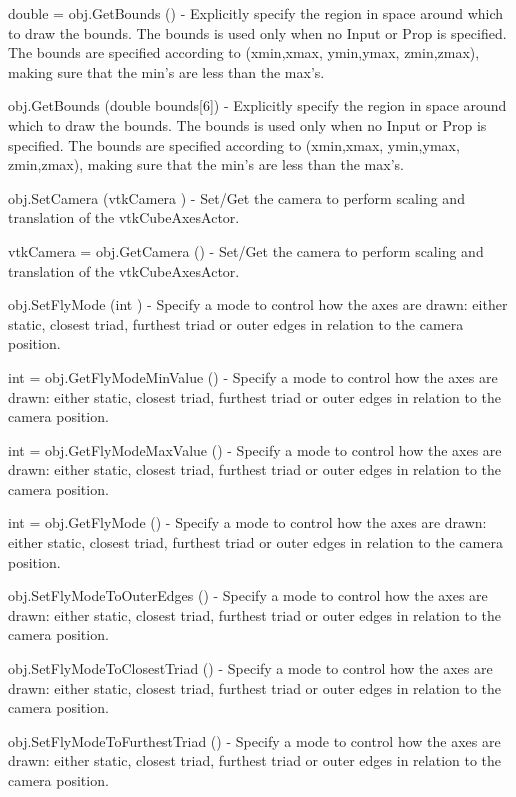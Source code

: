 \begin{DoxyItemize}
\item {\ttfamily double = obj.\-Get\-Bounds ()} -\/ Explicitly specify the region in space around which to draw the bounds. The bounds is used only when no Input or Prop is specified. The bounds are specified according to (xmin,xmax, ymin,ymax, zmin,zmax), making sure that the min's are less than the max's.  
\item {\ttfamily obj.\-Get\-Bounds (double bounds\mbox{[}6\mbox{]})} -\/ Explicitly specify the region in space around which to draw the bounds. The bounds is used only when no Input or Prop is specified. The bounds are specified according to (xmin,xmax, ymin,ymax, zmin,zmax), making sure that the min's are less than the max's.  
\item {\ttfamily obj.\-Set\-Camera (vtk\-Camera )} -\/ Set/\-Get the camera to perform scaling and translation of the vtk\-Cube\-Axes\-Actor.  
\item {\ttfamily vtk\-Camera = obj.\-Get\-Camera ()} -\/ Set/\-Get the camera to perform scaling and translation of the vtk\-Cube\-Axes\-Actor.  
\item {\ttfamily obj.\-Set\-Fly\-Mode (int )} -\/ Specify a mode to control how the axes are drawn\-: either static, closest triad, furthest triad or outer edges in relation to the camera position.  
\item {\ttfamily int = obj.\-Get\-Fly\-Mode\-Min\-Value ()} -\/ Specify a mode to control how the axes are drawn\-: either static, closest triad, furthest triad or outer edges in relation to the camera position.  
\item {\ttfamily int = obj.\-Get\-Fly\-Mode\-Max\-Value ()} -\/ Specify a mode to control how the axes are drawn\-: either static, closest triad, furthest triad or outer edges in relation to the camera position.  
\item {\ttfamily int = obj.\-Get\-Fly\-Mode ()} -\/ Specify a mode to control how the axes are drawn\-: either static, closest triad, furthest triad or outer edges in relation to the camera position.  
\item {\ttfamily obj.\-Set\-Fly\-Mode\-To\-Outer\-Edges ()} -\/ Specify a mode to control how the axes are drawn\-: either static, closest triad, furthest triad or outer edges in relation to the camera position.  
\item {\ttfamily obj.\-Set\-Fly\-Mode\-To\-Closest\-Triad ()} -\/ Specify a mode to control how the axes are drawn\-: either static, closest triad, furthest triad or outer edges in relation to the camera position.  
\item {\ttfamily obj.\-Set\-Fly\-Mode\-To\-Furthest\-Triad ()} -\/ Specify a mode to control how the axes are drawn\-: either static, closest triad, furthest triad or outer edges in relation to the camera position.  

\end{DoxyItemize}
